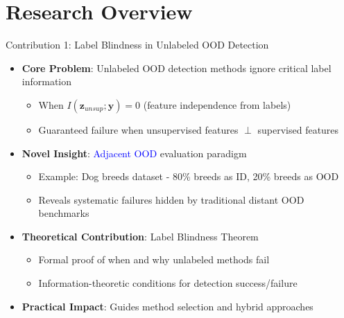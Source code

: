 \documentclass[aspectratio=169]{beamer}
\begin{document}
\section{Research Overview}

\begin{frame}{Contribution 1: Label Blindness in Unlabeled OOD Detection}
\begin{itemize}
    \item \textbf{Core Problem}: Unlabeled OOD detection methods ignore critical label information
    \begin{itemize}
        \item When $I(\mathbf{z}_{unsup}; \mathbf{y}) = 0$ (feature independence from labels)
        \item Guaranteed failure when unsupervised features $\perp$ supervised features
    \end{itemize}
    \item \textbf{Novel Insight}: \textcolor{blue}{Adjacent OOD} evaluation paradigm
    \begin{itemize}
        \item Example: Dog breeds dataset - 80\% breeds as ID, 20\% breeds as OOD
        \item Reveals systematic failures hidden by traditional distant OOD benchmarks
    \end{itemize}
    \item \textbf{Theoretical Contribution}: Label Blindness Theorem
    \begin{itemize}
        \item Formal proof of when and why unlabeled methods fail
        \item Information-theoretic conditions for detection success/failure
    \end{itemize}
    \item \textbf{Practical Impact}: Guides method selection and hybrid approaches
\end{itemize}
\end{frame}
\end{document}
